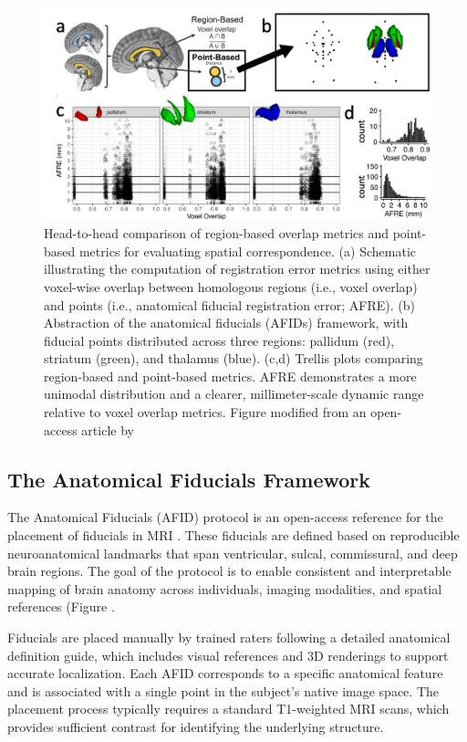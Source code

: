 \begin{figure}[hbt!]
    \centering
    \includegraphics[width=1\linewidth]{figs/ch1_Figure_afidsvsoverlap.png}
    \caption{Head-to-head comparison of region-based overlap metrics and point-based metrics for evaluating spatial correspondence. (a) Schematic illustrating the computation of registration error metrics using either voxel-wise overlap between homologous regions (i.e., voxel overlap) and points (i.e., anatomical fiducial registration error; AFRE). (b) Abstraction of the anatomical fiducials (AFIDs) framework, with fiducial points distributed across three regions: pallidum (red), striatum (green), and thalamus (blue). (c,d) Trellis plots comparing region-based and point-based metrics. AFRE demonstrates a more unimodal distribution and a clearer, millimeter-scale dynamic range relative to voxel overlap metrics. Figure modified from an open-access article by \cite{Lau2019-eh}}
    \label{fig:ch1_Figure_afidsvsoverlap}
\end{figure}

\subsection{The Anatomical Fiducials Framework}
The Anatomical Fiducials (AFID) protocol is an open-access reference for the placement of fiducials in MRI \cite{Lau2019-eh}. These fiducials are defined based on reproducible neuroanatomical landmarks that span ventricular, sulcal, commissural, and deep brain regions. The goal of the protocol is to enable consistent and interpretable mapping of brain anatomy across individuals, imaging modalities, and spatial references (Figure .

Fiducials are placed manually by trained raters following a detailed anatomical definition guide, which includes visual references and 3D renderings to support accurate localization. Each AFID corresponds to a specific anatomical feature and is associated with a single point in the subject's native image space. The placement process typically requires a standard T1-weighted MRI scans, which provides sufficient contrast for identifying the underlying structure.

